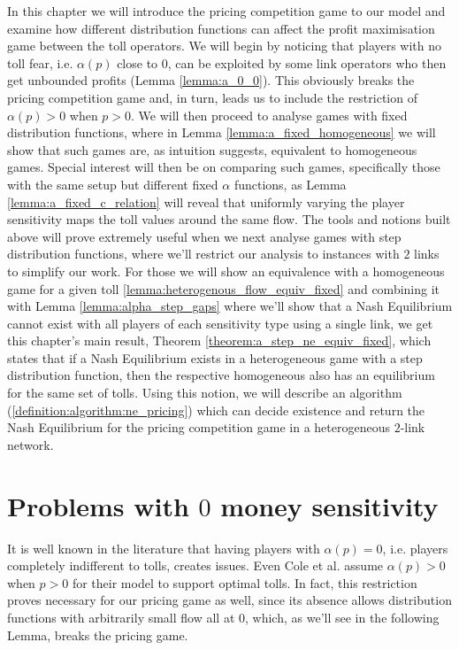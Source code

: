 \documentclass[10pt,a4paper]{book}
\theoremstyle{definition}
\theoremstyle{comment}
\begin{document}
In this chapter we will introduce the pricing competition game to our model and examine how different distribution functions can affect the profit maximisation game between the toll operators.
We will begin by noticing that players with no toll fear, i.e. $\alpha(p)$ close to $0$, can be exploited by some link operators who then get unbounded profits (Lemma \ref{lemma:a_0_0}).
This obviously breaks the pricing competition game and, in turn, leads us to include the restriction of $\alpha(p) > 0$ when $p > 0$.
We will then proceed to analyse games with fixed distribution functions, where in Lemma \ref{lemma:a_fixed_homogeneous} we will show that such games are, as intuition suggests, equivalent to homogeneous games.
Special interest will then be on comparing such games, specifically those with the same setup but different fixed $\alpha$ functions, as Lemma \ref{lemma:a_fixed_c_relation} will reveal that uniformly varying the player sensitivity maps the toll values around the same flow.
The tools and notions built above will prove extremely useful when we next analyse games with step distribution functions, where we'll restrict our analysis to instances with $2$ links to simplify our work.
For those we will show an equivalence with a homogeneous game for a given toll \ref{lemma:heterogenous_flow_equiv_fixed} and combining it with Lemma \ref{lemma:alpha_step_gaps} where we'll show that a Nash Equilibrium cannot exist with all players of each sensitivity type using a single link, we get this chapter's main result, Theorem \ref{theorem:a_step_ne_equiv_fixed}, which states that if a Nash Equilibrium exists in a heterogeneous game with a step distribution function, then the respective homogeneous also has an equilibrium for the same set of tolls.
Using this notion, we will describe an algorithm (\ref{definition:algorithm:ne_pricing}) which can decide existence and return the Nash Equilibrium for the pricing competition game in a heterogeneous $2$-link network.

\section{Problems with $0$ money sensitivity}

It is well known in the literature that having players with $\alpha(p) = 0$, i.e. players completely indifferent to tolls, creates issues.
Even Cole et al. \cite{10.1145/780542.780618} assume $\alpha(p) > 0$ when $p > 0$ for their model to support optimal tolls.
In fact, this restriction proves necessary for our pricing game as well, since its absence allows distribution functions with arbitrarily small flow all at $0$, which, as we'll see in the following Lemma, breaks the pricing game.
\end{document}
